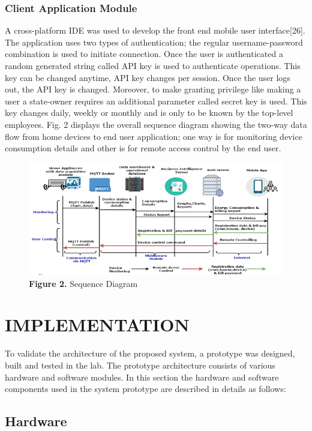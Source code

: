 \documentclass[a4paper,12pt,oneside]{article}
\let\counterwithin\relax
\begin{document}
\subsubsection{Client Application Module}
A cross-platform IDE was used to develop the front end
mobile user interface[26]. The application uses two types of
authentication; the regular username-password combination is
used to initiate connection. Once the user is authenticated a
random generated string called API key is used to authenticate
operations. This key can be changed anytime, API key
changes per session. Once the user logs out, the API key is
changed. Moreover, to make granting privilege like making a
user a state-owner requires an additional parameter called
secret key is used. This key changes daily, weekly or monthly
and is only to be known by the top-level employees. Fig. 2
displays the overall sequence diagram showing the two-way
data flow from home devices to end user application; one way
is for monitoring device consumption details and other is for
remote access control by the end user.
\begin{figure}[H]
\includegraphics{figure2.png}
\centering
\caption[Sequence Diagram]{\textbf{Figure 2.} Sequence Diagram}
\end{figure}

\newpage
\section{IMPLEMENTATION}
To validate the architecture of the proposed system, a
prototype was designed, built and tested in the lab. The
prototype architecture consists of various hardware and
software modules. In this section the hardware and software
components used in the system prototype are described in
details as follows:
\subsection{Hardware}
\end{document}
